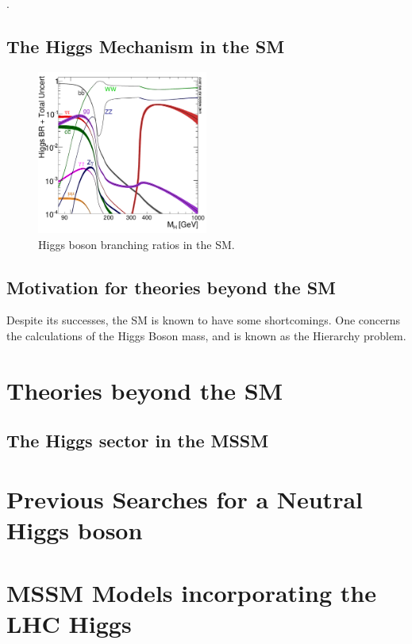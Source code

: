 \cite{GlashowPartialSymmetries,WeinbergModelOfLeptons,SalamNobelSymposium}.

\subsection{The Higgs Mechanism in the \ac{SM}}
\label{sec:SMHiggs}


\begin{figure}[htbp]
   \includegraphics[width=0.5\textwidth]{plots/theory/Higgs_BR.pdf}
\caption{Higgs boson branching ratios in the \ac{SM}\cite{}.}
\label{fig:SMHiggsBRs}
\end{figure}


\subsection{Motivation for theories beyond the \ac{SM}}

Despite its successes, the \ac{SM} is known to have some shortcomings. One concerns
the calculations of the Higgs Boson mass, and is known as the Hierarchy problem. 

\section{Theories beyond the SM}
\label{sec:BSM}

\subsection{The Higgs sector in the MSSM}
\label{sec:mssmhiggs}

\section{Previous Searches for a Neutral Higgs boson}
\label{sec:previoussearches}

\section{MSSM Models incorporating the LHC Higgs}
\label{sec:mssmbenchmarks}

